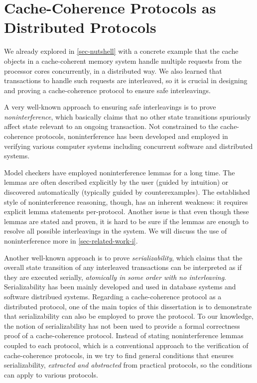 \section{Cache-Coherence Protocols as Distributed Protocols}

We already explored in \autoref{sec-nutshell} with a concrete example that the cache objects in a cache-coherent memory system handle multiple requests from the processor cores concurrently, in a distributed way.
We also learned that transactions to handle such requests are interleaved, so it is crucial in designing and proving a cache-coherence protocol to ensure safe interleavings.

A very well-known approach to ensuring safe interleavings is to prove \emph{noninterference}, which basically claims that no other state transitions spuriously affect state relevant to an ongoing transaction.
Not constrained to the cache-coherence protocols, noninterference has been developed and employed in verifying various computer systems including concurrent software and distributed systems.

Model checkers have employed noninterference lemmas for a long time.
The lemmas are often described explicitly by the user (guided by intuition) or discovered automatically (typically guided by counterexamples).
The established style of noninterference reasoning, though, has an inherent weakness: it requires explicit lemma statements per-protocol.
Another issue is that even though these lemmas are stated and proven, it is hard to be sure if the lemmas are enough to resolve all possible interleavings in the system.
We will discuss the use of noninterference more in \autoref{sec-related-work-i}.

Another well-known approach is to prove \emph{serializability}, which claims that the overall state transition of any interleaved transactions can be interpreted as if they are executed serially, \ie{} \emph{atomically in some order with no interleaving}.
Serializability has been mainly developed and used in database systems and software distribued systems.
Regarding a cache-coherence protocol as a distributed protocol, one of the main topics of this dissertation is to demonstrate that serializability can also be employed to prove the protocol.
To our knowledge, the notion of serializability has not been used to provide a formal correctness proof of a cache-coherence protocol.
Instead of stating noninterference lemmas coupled to each protocol, which is a conventional approach to the verification of cache-coherence protocols, in \hemiola{} we try to find general conditions that ensures serializability, \emph{extracted and abstracted} from practical protocols, so the conditions can apply to various protocols.

